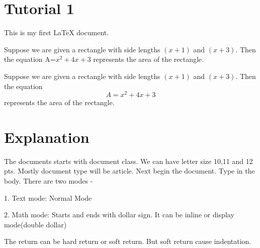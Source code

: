 \documentclass[11pt]{article}
\begin{document}
\section*{Tutorial 1}
This is my first LaTeX document.

Suppose we are given a rectangle with side lengths $(x+1)$ and $(x+3)$. Then the equation A=$x^2 + 4x+3$ represents the area of the rectangle.

Suppose we are given a rectangle with side lengths $(x+1)$ and $(x+3)$. Then the equation $$A=x^2 + 4x+3$$ represents the area of the rectangle.

\section*{Explanation}
The documents starts with document class. We can have letter size 10,11 and 12 pts. Mostly document type will be article. Next begin the document. Type in the body. There are two modes -

1. Text mode: Normal Mode

2. Math mode: Starts and ends with dollar sign. It can be inline or display mode(double dollar)

The return can be hard return or soft return. But soft return cause indentation.
\end{document}
